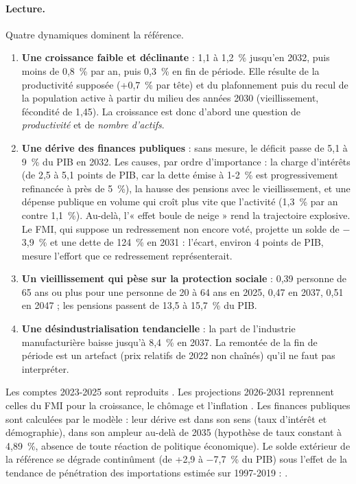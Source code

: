 \paragraph{Lecture.} Quatre dynamiques dominent la référence.
\begin{enumerate}
\item \textbf{Une croissance faible et déclinante} : 1,1 à 1,2~\% jusqu'en 2032, puis moins de 0,8~\% par an, puis
0,3~\% en fin de période. Elle résulte de la productivité supposée (+0,7~\% par tête) et du plafonnement puis du recul
de la population active à partir du milieu des années 2030 (vieillissement, fécondité de 1,45). La croissance est donc
d'abord une question de \emph{productivité} et de \emph{nombre d'actifs}.
\item \textbf{Une dérive des finances publiques} : sans mesure, le déficit passe de 5,1 à 9~\% du PIB en 2032. Les
causes, par ordre d'importance : la charge d'intérêts (de 2,5 à 5,1 points de PIB, car la dette émise à 1-2~\% est
progressivement refinancée à près de 5~\%), la hausse des pensions avec le vieillissement, et une dépense publique en
volume qui croît plus vite que l'activité (1,3~\% par an contre 1,1~\%). Au-delà, l'« effet boule de neige » rend la
trajectoire explosive. Le FMI, qui suppose un redressement non encore voté, projette un solde de $-$3,9~\% et une dette
de 124~\% en 2031 : l'écart, environ 4 points de PIB, mesure l'effort que ce redressement représenterait.
\item \textbf{Un vieillissement qui pèse sur la protection sociale} : 0,39 personne de 65 ans ou plus pour une personne
de 20 à 64 ans en 2025, 0,47 en 2037, 0,51 en 2047 ; les pensions passent de 13,5 à 15,7~\% du PIB.
\item \textbf{Une désindustrialisation tendancielle} : la part de l'industrie manufacturière baisse jusqu'à 8,4~\% en
2037. La remontée de la fin de période est un artefact (prix relatifs de 2022 non chaînés) qu'il ne faut pas
interpréter.
\end{enumerate}

\begin{limites}
Les comptes 2023-2025 sont reproduits . Les projections 2026-2031 reprennent celles du FMI pour la
croissance, le chômage et l'inflation . Les finances publiques sont calculées par le modèle : leur
dérive est  dans son sens (taux d'intérêt et démographie),  dans son ampleur au-delà
de 2035 (hypothèse de taux constant à 4,89~\%, absence de toute réaction de politique économique). Le solde extérieur
de la référence se dégrade continûment (de +2,9 à $-$7,7~\% du PIB) sous l'effet de la tendance de pénétration des
importations estimée sur 1997-2019 : .
\end{limites}
